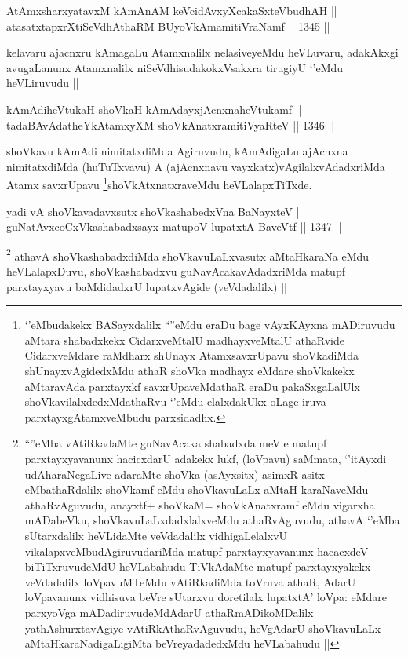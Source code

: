 \begin{shl}
AtAmxsharxyatavxM kAmAnAM keVcidAvxyXcakaSxteV\s budhAH || \\
atasatxtapxrXtiSeVdhAthaRM BUyoV\s kAmamitiVraNamf ||  1345 ||  
\end{shl}

\begin{artha}
kelavaru ajacnxru kAmagaLu Atamxnalilx nelasiveyeMdu heVLuvaru, adakAkxgi avugaLanunx Atamxnalilx niSeVdhisudakokxVsakxra tirugiyU `\stext'eMdu heVLiruvudu ||
\end{artha}


\begin{shl}
kAmAdiheVtukaH shoVkaH kAmAdayxjAcnxnaheVtukamf || \\
tadaBAvAdatheYkAtamxyXM shoVkAnatxramitiVyaRteV ||  1346 ||  
\end{shl}

\begin{artha}
shoVkavu kAmAdi nimitatxdiMda Agiruvudu, kAmAdigaLu ajAcnxna nimitatxdiMda (huTuTxvavu) A (ajAcnxnavu vayxkatx)vAgilalxvAdadxriMda Atamx savxrUpavu \footnote{`\stext'eMbudakekx BASayxdalilx ``\stext''eMdu eraDu bage vAyxKAyxna mADiruvudu aMtara shabadxkekx CidarxveMtalU madhayxveMtalU athaRvide CidarxveMdare raMdharx shUnayx AtamxsavxrUpavu shoVkadiMda shUnayxvAgidedxMdu athaR shoVka madhayx eMdare shoVkakekx aMtaravAda parxtayxkf savxrUpaveMdathaR eraDu pakaSxgaLalUlx shoVkavilalxdedxMdathaRvu `\stext'eMdu elalxdakUkx oLage iruva parxtayxgAtamxveMbudu parxsidadhx.}shoVkAtxnatxraveMdu heVLalapxTiTxde.
\end{artha}


\begin{shl}
yadi vA shoVkavadavxsutx shoVkashabedxVna BaNayxteV || \\
guNatAvxcoCxVkashabadxsayx matupoV lupatxtA BaveVtf ||  1347 ||  
\end{shl}

\begin{artha}
\footnote{``\stext''eMba vAtiRkadaMte guNavAcaka shabadxda meVle matupf parxtayxyavanunx hacicxdarU adakekx lukf, (loVpavu) saMmata, `\stext'itAyxdi udAharaNegaLive adaraMte shoVka (asAyxsitx) asimxR asitx eMbathaRdalilx shoVkamf eMdu shoVkavuLaLx aMtaH karaNaveMdu athaRvAguvudu, anayxtf+ shoVkaM= shoVkAnatxramf eMdu vigarxha mADabeVku, shoVkavuLaLxdadxlalxveMdu athaRvAguvudu, athavA `\stext'eMba sUtarxdalilx heVLidaMte veVdadalilx vidhigaLelalxvU vikalapxveMbudAgiruvudariMda matupf parxtayxyavanunx hacacxdeV biTiTxruvudeMdU heVLabahudu TiVkAdaMte matupf parxtayxyakekx veVdadalilx loVpavuMTeMdu vAtiRkadiMda toVruva athaR, AdarU loVpavanunx vidhisuva beVre sUtarxvu doretilalx lupatxtA' loVpa: eMdare parxyoVga mADadiruvudeMdAdarU athaRmADikoMDalilx yathAshurxtavAgiye vAtiRkAthaRvAguvudu, heVgAdarU shoVkavuLaLx aMtaHkaraNadigaLigiMta beVreyadadedxMdu heVLabahudu ||}
athavA shoVkashabadxdiMda shoVkavuLaLxvasutx aMtaHkaraNa eMdu heVLalapxDuvu, shoVkashabadxvu guNavAcakavAdadxriMda matupf parxtayxyavu baMdidadxrU lupatxvAgide (veVdadalilx) ||  
\end{artha}

